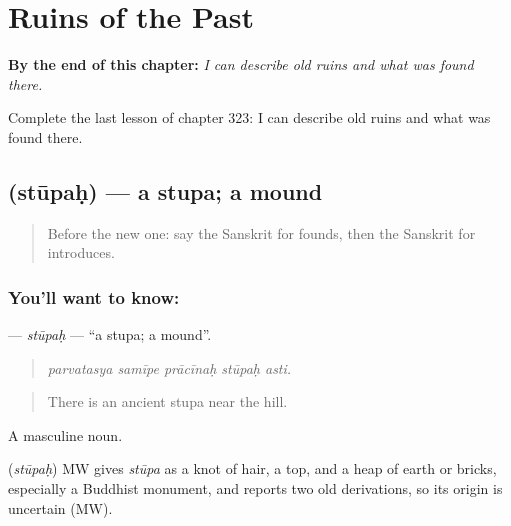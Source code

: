 
\chapter{Ruins of the Past}
\label{ch:sa-ruins-of-the-past}

\begin{chapteropening}
\textbf{By the end of this chapter:} \emph{I can describe old ruins and what was found there.}

Complete the last lesson of chapter 323: I can describe old ruins and what was found there.
\end{chapteropening}

\section[\texorpdfstring{\sk{स्तूपः} (stūpaḥ)}{स्तूपः (stūpaḥ)}]{ (stūpaḥ) — a stupa; a mound}

\label{lesson:SA-C323-stupah}



\begin{quote}
Before the new one: say the Sanskrit for founds, then the Sanskrit for introduces.
\end{quote}

\subsection*{You'll want to know: }
\textbf{} — \emph{stūpaḥ} — \textquotedblleft{}a stupa; a mound\textquotedblright{}.

\begin{quote}
    
\end{quote}

\begin{quote}
\emph{parvatasya samīpe prācīnaḥ stūpaḥ asti.}
\end{quote}

\begin{quote}
There is an ancient stupa near the hill.
\end{quote}

A masculine noun.

\begin{cousinweb}
\textbf{} (\emph{stūpaḥ}) MW gives \emph{stūpa} as a knot of hair, a top, and a heap of earth or bricks, especially a Buddhist monument, and reports two old derivations, so its origin is uncertain (MW).
\end{cousinweb}

